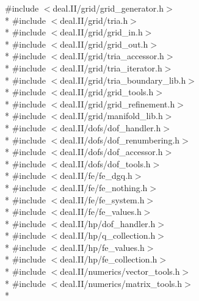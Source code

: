 {\ttfamily \#include $<$deal.\-I\-I/grid/grid\-\_\-generator.\-h$>$}\\*
{\ttfamily \#include $<$deal.\-I\-I/grid/tria.\-h$>$}\\*
{\ttfamily \#include $<$deal.\-I\-I/grid/grid\-\_\-in.\-h$>$}\\*
{\ttfamily \#include $<$deal.\-I\-I/grid/grid\-\_\-out.\-h$>$}\\*
{\ttfamily \#include $<$deal.\-I\-I/grid/tria\-\_\-accessor.\-h$>$}\\*
{\ttfamily \#include $<$deal.\-I\-I/grid/tria\-\_\-iterator.\-h$>$}\\*
{\ttfamily \#include $<$deal.\-I\-I/grid/tria\-\_\-boundary\-\_\-lib.\-h$>$}\\*
{\ttfamily \#include $<$deal.\-I\-I/grid/grid\-\_\-tools.\-h$>$}\\*
{\ttfamily \#include $<$deal.\-I\-I/grid/grid\-\_\-refinement.\-h$>$}\\*
{\ttfamily \#include $<$deal.\-I\-I/grid/manifold\-\_\-lib.\-h$>$}\\*
{\ttfamily \#include $<$deal.\-I\-I/dofs/dof\-\_\-handler.\-h$>$}\\*
{\ttfamily \#include $<$deal.\-I\-I/dofs/dof\-\_\-renumbering.\-h$>$}\\*
{\ttfamily \#include $<$deal.\-I\-I/dofs/dof\-\_\-accessor.\-h$>$}\\*
{\ttfamily \#include $<$deal.\-I\-I/dofs/dof\-\_\-tools.\-h$>$}\\*
{\ttfamily \#include $<$deal.\-I\-I/fe/fe\-\_\-dgq.\-h$>$}\\*
{\ttfamily \#include $<$deal.\-I\-I/fe/fe\-\_\-nothing.\-h$>$}\\*
{\ttfamily \#include $<$deal.\-I\-I/fe/fe\-\_\-system.\-h$>$}\\*
{\ttfamily \#include $<$deal.\-I\-I/fe/fe\-\_\-values.\-h$>$}\\*
{\ttfamily \#include $<$deal.\-I\-I/hp/dof\-\_\-handler.\-h$>$}\\*
{\ttfamily \#include $<$deal.\-I\-I/hp/q\-\_\-collection.\-h$>$}\\*
{\ttfamily \#include $<$deal.\-I\-I/hp/fe\-\_\-values.\-h$>$}\\*
{\ttfamily \#include $<$deal.\-I\-I/hp/fe\-\_\-collection.\-h$>$}\\*
{\ttfamily \#include $<$deal.\-I\-I/numerics/vector\-\_\-tools.\-h$>$}\\*
{\ttfamily \#include $<$deal.\-I\-I/numerics/matrix\-\_\-tools.\-h$>$}\\*
